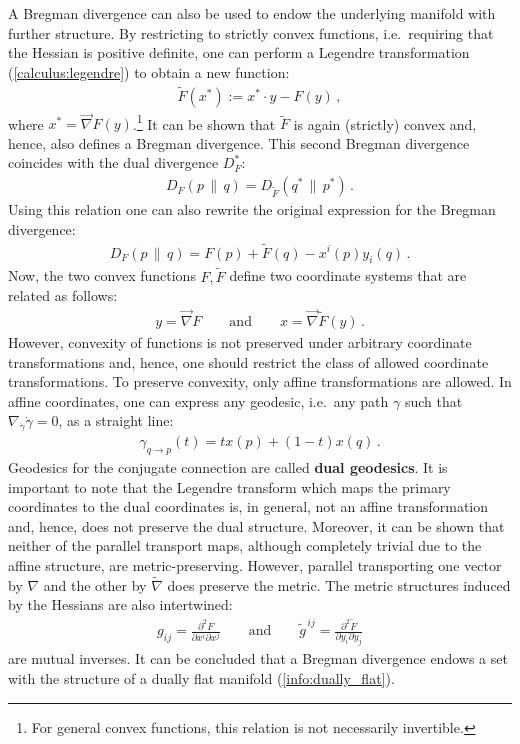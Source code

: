     A Bregman divergence can also be used to endow the underlying manifold with further structure. By restricting to strictly convex functions, i.e.~requiring that the Hessian is positive definite, one can perform a Legendre transformation (\cref{calculus:legendre}) to obtain a new function:
    \begin{gather}
        \label{info:legendre}
        \widetilde{F}(x^*) := x^*\cdot y - F(y)\,,
    \end{gather}
    where $x^*=\vec{\nabla}F(y)$.\footnote{For general convex functions, this relation is not necessarily invertible.} It can be shown that $\widetilde{F}$ is again (strictly) convex and, hence, also defines a Bregman divergence. This second Bregman divergence coincides with the dual divergence $D_F^*$:
    \begin{gather}
        D_F(p\,\|\,q) = D_{\widetilde{F}}(q^*\,\|\,p^*)\,.
    \end{gather}
    Using this relation one can also rewrite the original expression for the Bregman divergence:
    \begin{gather}
        D_F(p\,\|\,q) = F(p) + \widetilde{F}(q) - x^i(p)y_i(q)\,.
    \end{gather}
    Now, the two convex functions $F,\widetilde{F}$ define two coordinate systems that are related as follows:
    \begin{gather}
        y=\vec{\nabla}F\qquad\text{and}\qquad x=\vec{\nabla}\widetilde{F}(y)\,.
    \end{gather}
    However, convexity of functions is not preserved under arbitrary coordinate transformations and, hence, one should restrict the class of allowed coordinate transformations. To preserve convexity, only affine transformations are allowed. In affine coordinates, one can express any geodesic, i.e.~any path $\gamma$ such that $\nabla_{\dot{\gamma}}\dot{\gamma}=0$, as a straight line:
    \begin{gather}
        \gamma_{q\rightarrow p}(t) = tx(p) + (1-t)x(q)\,.
    \end{gather}
    Geodesics for the conjugate connection are called \textbf{dual geodesics}. It is important to note that the Legendre transform which maps the primary coordinates to the dual coordinates is, in general, not an affine transformation and, hence, does not preserve the dual structure. Moreover, it can be shown that neither of the parallel transport maps, although completely trivial due to the affine structure, are metric-preserving. However, parallel transporting one vector by $\nabla$ and the other by $\widetilde{\nabla}$ does preserve the metric. The metric structures induced by the Hessians are also intertwined:
    \begin{gather}
        \label{info:bregman_metric}
        g_{ij} = \frac{\partial^2F}{\partial x^i\partial x^j}\qquad\text{and}\qquad \widetilde{g}^{\,ij} = \frac{\partial^2\widetilde{F}}{\partial y_i\partial y_j}
    \end{gather}
    are mutual inverses. It can be concluded that a Bregman divergence endows a set with the structure of a dually flat manifold (\cref{info:dually_flat}).


